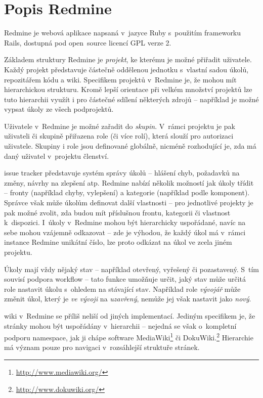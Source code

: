 \documentclass[thesis=B,czech]{FITthesis}[2012/05/02]
\begin{document}
\section{Popis Redmine}

Redmine je webová aplikace napsaná v~jazyce Ruby s~použitím frameworku
Rails, dostupná pod open~source licencí \gls{GPL} verze 2.

Základem struktury Redmine je \emph{projekt}, ke kterému je možné
přiřadit uživatele. Každý projekt představuje částečně oddělenou
jednotku s~vlastní sadou úkolů, repozitářem kódu a \gls{wiki}.
Specifikem projektů v~Redmine je, že mohou mít hierarchickou strukturu.
Kromě lepší orientace při velkém množství projektů lze tuto hierarchii
využít i pro částečné sdílení některých zdrojů -- například je možné
vypsat úkoly ze všech podprojektů.

Uživatele v~Redmine je možné zařadit do \emph{skupin}. V~rámci projektu
je pak uživateli či skupině přiřazena role (či více rolí), která slouží
pro autorizaci uživatele. Skupiny i role jsou definované globálně,
nicméně rozhodující je, zda má daný uživatel v~projektu členství.

\Gls{issue tracker} představuje systém správy úkolů -- hlášení chyb,
požadavků na změny, návrhy na zlepšení atp. Redmine nabízí několik
možností jak úkoly třídit -- fronty (například chyby, vylepšení) a
kategorie (například podle komponent). Správce však může úkolům
definovat další vlastnosti -- pro jednotlivé projekty je pak možné
zvolit, zda budou mít příslušnou frontu, kategorii či vlastnost
k~dispozici. I~úkoly v~Redmine mohou být hierarchicky uspořádané, navíc na
sebe mohou vzájemně odkazovat -- zde je výhodou, že každý úkol má
v~rámci instance Redmine unikátní číslo, lze proto odkázat na úkol ve
zcela jiném projektu.

Úkoly mají vždy nějaký stav -- například otevřený, vyřešený či
pozastavený. S~tím souvisí podpora \gls{workflow} -- tato funkce
umožňuje určit, jaký stav může určitá role nastavit úkolu s~ohledem na
stávající stav. Například role \emph{vývojář} může změnit úkol, který je
\emph{ve vývoji} na \emph{uzavřený}, nemůže jej však nastavit jako
\emph{nový}.

\Gls{wiki} v~Redmine se příliš neliší od jiných implementací. Jediným
specifikem je, že stránky mohou být uspořádány v~hierarchii -- nejedná
se však o~kompletní podporu \gls{namespace}, jak ji chápe software
MediaWiki\footnote{\url{http://www.mediawiki.org/}} či
DokuWiki.\footnote{\url{http://www.dokuwiki.org/}} Hierarchie má význam
pouze pro navigaci v~rozsáhlejší struktuře stránek.
\end{document}
